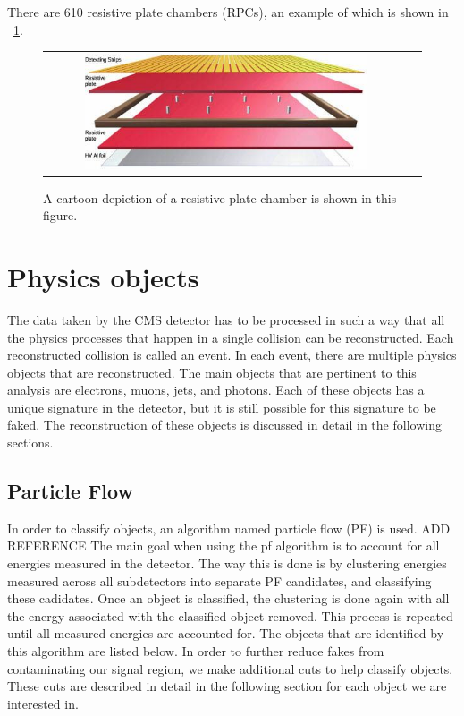 There are 610 resistive plate chambers (RPCs), an example of which is shown in ~\ref{fig:RPC}.

\begin{figure}[!ht]
\begin{center}
\begin{tabular}{cc}
\includegraphics[width=0.8\textwidth]{cms/figs/RPClayers.png}
\end{tabular}
\caption{ A cartoon depiction of a resistive plate chamber is shown in this figure. 
\label{fig:RPC}
}
\end{center}
\end{figure}


\section{Physics objects}
The data taken by the CMS detector has to be processed in such a way that all the physics processes that happen in a single collision can be reconstructed.
Each reconstructed collision is called an event.
In each event, there are multiple physics objects that are reconstructed.
The main objects that are pertinent to this analysis are electrons, muons, jets, and photons.
Each of these objects has a unique signature in the detector, but it is still possible for this signature to be faked.
The reconstruction of these objects is discussed in detail in the following sections.

\subsection{Particle Flow}
\label{subs:particleflow}
In order to classify objects, an algorithm named particle flow (PF) is used. ADD REFERENCE
The main goal when using the pf algorithm is to account for all energies measured in the detector.
The way this is done is by clustering energies measured across all subdetectors into separate PF candidates, and classifying these cadidates.
Once an object is classified, the clustering is done again with all the energy associated with the classified object removed.
This process is repeated until all measured energies are accounted for.
The objects that are identified by this algorithm are listed below.
In order to further reduce fakes from contaminating our signal region, we make additional cuts to help classify objects.
These cuts are described in detail in the following section for each object we are interested in.

